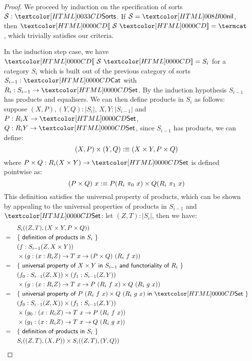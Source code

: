 \begin{proof}
  We proceed by induction on the specification of sorts
  $\Ss : \sortsty$.  If $\Ss = \sortsnil$, then $\SortCat{\Ss} = \termcat$,
  which trivially satisfies our criteria.

  In the induction step case, we have $\SortCat{\Ss} = S_i$ for a
  category $S_i$ which is built out of the previous category of sorts
  $S_{i-1} : \Cat$ with $R_i : S_{i-1} \to \Set$. By the induction
  hypothesis $S_{i-1}$ has products and equalisers. We can then define
  products in $S_{i}$ as follows: suppose $(X,P), (Y,Q) : | S_{i} |$,
  \ie $X, Y : | S_{i-1} |$ and $P : R_i X \to \Set$,
  $Q : R_i Y \to \Set$, since $S_{i-1}$ has products, we can define:
  \[
    (X,P) \times (Y,Q) :\equiv (X \times Y , P \times Q)
  \]
  where $P \times Q : R_i (X \times Y) \to \Set$ is defined pointwise
  as:
  \[
    (P \times Q)\ x :\equiv P (R_i\ \pi_0\ x) \times Q (R_i\ \pi_1\ x)
  \]
  This definition satisfies the universal property of products, which
  can be shown by appealing to the universal properties of products in
  $S_{i-1}$ and $\Set$: let $(Z,T) : | S_{i} |$, then we have:
  \begin{align*}
    &&&S_i((Z,T),(X \times Y, P \times Q)) \\
    &=& &\reasontext{definition of products in $S_i$} \\
    &&& (f : S_{i-1}(Z,X \times Y)) \\
    &&& \times (g : (x : R_i Z) \to T\ x \to (P \times Q)\ (R_i\ f\ x)) \\
    &=& &\reasontext{universal property of $X \times Y$ in $S_{i-1}$ and functoriality of $R_i$} \\
    &&& (f_0 : S_{i-1}(Z,X)) \times (f_1 : S_{i-1}(Z,Y)) \\
    &&& \times (g : (x : R_iZ) \to T\ x \to P\ (R_i\ f\ x) \times Q\ (R_i\ g\ x)) \\
    &=& &\reasontext{universal property of $P\ (R_i\ f\ x) \times Q\ (R_i\ g\ x)$ in $\Set$} \\
    &&& (f_0 : S_{i-1}(Z,X)) \times (f_1 : S_{i-1}(Z,Y)) \\
    &&& \times (g_0 : (x : R_iZ) \to T\ x \to P\ (R_i\ f\ x)) \\
    &&& \times (g_1 : (x : R_iZ) \to T\ x \to Q\ (R_i\ g\ x)) \\
    &=& &\reasontext{definition of products in $S_i$} \\
    &&& S_i((Z,T),(X,P)) \times S_i((Z,T),(Y,Q))
  \end{align*}
\end{proof}

